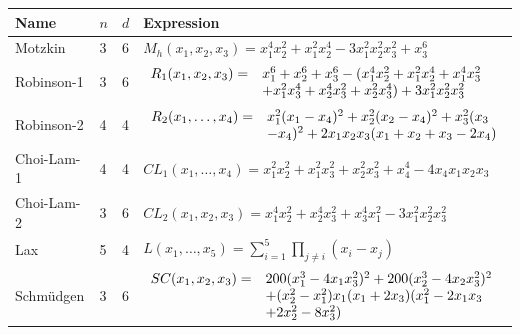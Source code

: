\documentclass[12pt]{article}
\theoremstyle{remark}
\begin{document}
\begin{table}
  \centering
  \small
  \begin{tabular}{llll}\toprule
Name & $n$ & $d$ &\hfil Expression\\\midrule
    Motzkin & 3 & 6 & $M_h(x_1,x_2,x_3)=x_1^4x_2^2+x_1^2x_2^4-3x_1^2x_2^2x_3^2+x_3^6$\\
        Robinson-1 & 3 & 6 & \hspace{-1.6ex} $\begin{array}[t]{ll}R_1(x_1,x_2,x_3) =&x_1^6+x_2^6+x_3^6- (x_1^4x_2^2+x_1^2x_2^4+x_1^4x_3^2\\ &+x_1^2x_3^4+x_2^4x_3^2+x_2^2x_3^4)+3x_1^2x_2^2x_3^2\end{array}$\\
  Robinson-2 & 4 & 4& \hspace{-1.6ex} $\begin{array}[t]{ll}R_2(x_1,\ldots,x_4)=&x_1^2(x_1-x_4)^2+x_2^2(x_2-x_4)^2+x_3^2(x_3\\&-x_4)^2+2x_1x_2x_3(x_1+x_2+x_3-2x_4)\end{array}$\\
  Choi-Lam-1 & 4 & 4 & $        CL_1(x_1,\ldots,x_4)=x_1^2x_2^2+x_1^2x_3^2+x_2^2x_3^2+x_4^4-4x_4x_1x_2x_3$\\
  Choi-Lam-2 & 3 & 6 & $CL_2(x_1,x_2,x_3)=x_1^4x_2^2+x_2^4x_3^2+x_3^4x_1^2-3x_1^2x_2^2x_3^2$\\
  Lax & 5&4 &$L(x_1,\ldots,x_5)=\sum_{i=1}^5\prod_{j\neq i}(x_i-x_j)$ \\
  Schm\"udgen & 3 & 6&\hspace{-1.6ex} $\begin{array}[t]{ll}SC(x_1,x_2,x_3)=&200(x_1^3-4x_1x_3^2)^2+200(x_2^3-4x_2x_3^2)^2\\&+(x_2^2-x_1^2)x_1(x_1+2x_3)(x_1^2-2x_1x_3\\&+2x_2^2-8x_3^2)\end{array}$\\

\end{tabular}
\end{table}
\end{document}
